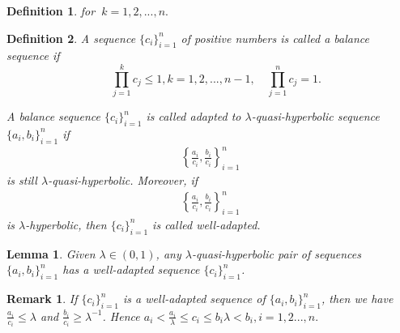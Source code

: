 \documentclass[12pt]{article}
\newtheorem{remark}{Remark}[section]
\newtheorem{definition}{Definition}[section]
\newtheorem{lemma}{Lemma}[section]
\begin{document}
\begin{definition}
                                                                                                                                                                                                                                                                                                                                                                                                                                                                                                                                                                                                                                                                                                                                                                                                      
for $\ k=1,2,...,n.  $
\end{definition}

\begin{definition}
	A sequence $\{c_i\}_{i=1}^n$ of positive numbers is
	called a balance sequence if
	$$
	\quad \prod_{j=1}^k c_j\leqslant 1, k=1,2,...,n-1,\quad
	\prod_{j=1}^n c_j=1.
	$$
	
	A balance sequence $\{c_i\}_{i=1}^n$ is called adapted to
	$\lambda$-quasi-hyperbolic sequence $\{a_i,b_i\}_{i=1}^n$
	if
	\begin{align*}
		\left\{\frac{a_i}{c_i},\frac{b_i}{c_i}\right\}_{i=1}^n
	\end{align*}
	is still $\lambda$-quasi-hyperbolic. Moreover, if
	\begin{align*}
		\left\{\frac{a_i}{c_i},\frac{b_i}{c_i}\right\}_{i=1}^n
	\end{align*}
	is $\lambda$-hyperbolic, then $\{c_i\}_{i=1}^n$ is called
	well-adapted.
\end{definition}
\begin{lemma}\label{lem:3.1}
Given $ \lambda\in (0,1) $, any $ \lambda $-quasi-hyperbolic pair of sequences $ \{a_{i},b_{i}\}_{i=1}^{n}  $ has a well-adapted sequence $\{c_{i}\}_{i=1}^{n} $.
\end{lemma}

\begin{remark}\label{rem:3.1}
If $\{c_{i}\}_{i=1}^{n} $ is a well-adapted sequence of $ \{a_{i},b_{i}\}_{i=1}^{n} $, then we have $ \frac{a_{i}}{c_{i}}\leqslant\lambda $ and $ \frac{b_{i}}{c_{i}}\geqslant\lambda^{-1} $. Hence $ a_{i}<\frac{a_{i}}{\lambda}\leqslant c_{i}\leqslant b_{i}\lambda<b_{i},i=1,2...,n. $
\end{remark}
\end{document}
